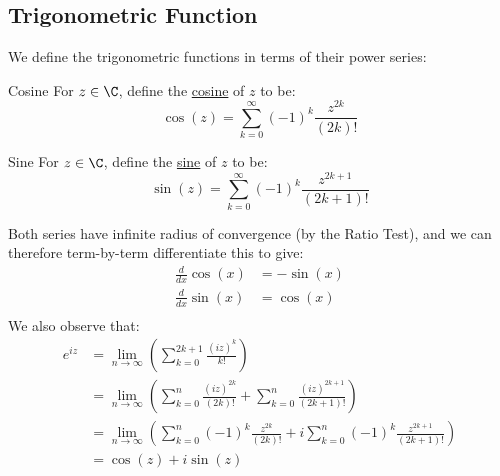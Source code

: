 \documentclass[../Main.tex]{subfiles}
\begin{document}
\subsection{Trigonometric Function}
We define the trigonometric functions in terms of their power series:
\begin{definition}{Cosine}
    For $z \in \C$, define the \underline{cosine} of $z$ to be:
    \begin{equation*}
        \cos(z) = \sum_{k = 0}^\infty (-1)^k \frac{z^{2k}}{(2k)!}
    \end{equation*}
\end{definition}
\begin{definition}{Sine}
    For $z \in \C$, define the \underline{sine} of $z$ to be:
    \begin{equation*}
        \sin(z) = \sum_{k = 0}^\infty (-1)^k \frac{z^{2k+1}}{(2k+1)!}
    \end{equation*}
\end{definition}
Both series have infinite radius of convergence (by the Ratio Test), and we can therefore term-by-term differentiate this to give:
\begin{align*}
    \frac{d}{dx} \cos(x) &= -\sin(x) \\
    \frac{d}{dx} \sin(x) &= \cos(x) \\
\end{align*}
We also observe that:
\begin{align*}
    e^{iz} &= \lim_{n \to \infty} \left(\sum_{k = 0}^{2k + 1} \frac{(iz)^k}{k!}\right) \\
    &= \lim_{n \to \infty} \left(\sum_{k = 0}^n \frac{(iz)^{2k}}{(2k)!} + \sum_{k = 0}^n \frac{(iz)^{2k+1}}{(2k+1)!}\right) \\
    &= \lim_{n \to \infty} \left(\sum_{k = 0}^n (-1)^k \frac{z^{2k}}{(2k)!} + i\sum_{k = 0}^n (-1)^k \frac{z^{2k+1}}{(2k+1)!}\right) \\
    &= \cos(z) + i\sin(z)
\end{align*}
\end{document}
